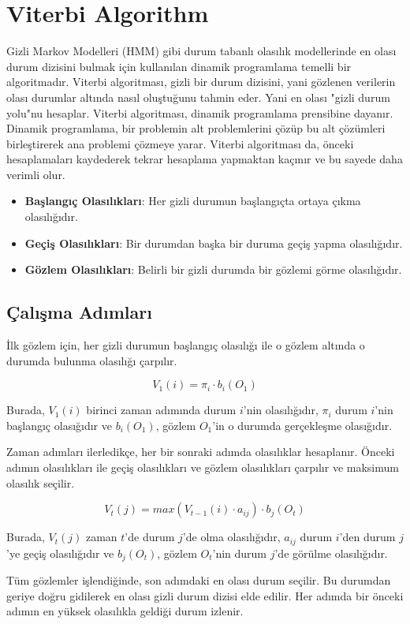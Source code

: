 \section{Viterbi Algorithm}

Gizli Markov Modelleri (HMM) gibi durum tabanlı olasılık modellerinde en olası durum dizisini bulmak için kullanılan dinamik programlama temelli bir algoritmadır. Viterbi algoritması, gizli bir durum dizisini, yani gözlenen verilerin olası durumlar altında nasıl oluştuğunu tahmin eder. Yani en olası "gizli durum yolu"nu hesaplar. Viterbi algoritması, dinamik programlama prensibine dayanır. Dinamik programlama, bir problemin alt problemlerini çözüp bu alt çözümleri birleştirerek ana problemi çözmeye yarar. Viterbi algoritması da, önceki hesaplamaları kaydederek tekrar hesaplama yapmaktan kaçınır ve bu sayede daha verimli olur.

\begin{itemize}
    \item \textbf{Başlangıç Olasılıkları}: Her gizli durumun başlangıçta ortaya çıkma olasılığıdır.
    \item \textbf{Geçiş Olasılıkları}: Bir durumdan başka bir duruma geçiş yapma olasılığıdır.
    \item \textbf{Gözlem Olasılıkları}: Belirli bir gizli durumda bir gözlemi görme olasılığıdır.
\end{itemize}

\subsection{Çalışma Adımları}

İlk gözlem için, her gizli durumun başlangıç olasılığı ile o gözlem altında o durumda bulunma olasılığı çarpılır.

\[ V_1 (i) = \pi_i \cdot b_i (O_1) \]

Burada, $V_1 (i)$ birinci zaman adımında durum $i$'nin olasılığıdır, $\pi_i$ durum $i$'nin başlangıç olasığıdır ve $b_i (O_1)$, gözlem $O_1$'in o durumda gerçekleşme olasığıdır.

Zaman adımları ilerledikçe, her bir sonraki adımda olasılıklar hesaplanır. Önceki adımın olasılıkları ile geçiş olasılıkları ve gözlem olasılıkları çarpılır ve maksimum olasılık seçilir.

\[ V_t (j) = max(V_{t-1} (i) \cdot a_{ij}) \cdot b_j (O_t) \]

Burada, $V_t (j)$ zaman $t$'de durum $j$'de olma olasılığıdır, $a_{ij}$ durum $i$'den durum $j$'ye geçiş olasılığıdır ve $b_j (O_t)$, gözlem $O_t$'nin durum $j$'de görülme olasılığıdır.

Tüm gözlemler işlendiğinde, son adımdaki en olası durum seçilir. Bu durumdan geriye doğru gidilerek en olası gizli durum dizisi elde edilir. Her adımda bir önceki adımın en yüksek olasılıkla geldiği durum izlenir.

\newpage